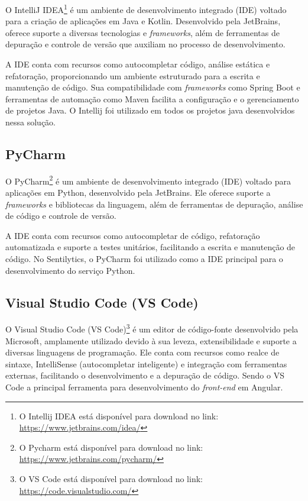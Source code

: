 \documentclass[
	12pt,				%
	oneside,			%
	a4paper,			%
	english,			%
	french,				%
	spanish,			%
	brazil				%
	]{abntex2}
\begin{document}
O IntelliJ IDEA\footnote{O Intellij IDEA está disponível para download
  no link: \url{https://www.jetbrains.com/idea/}} é um ambiente de
desenvolvimento integrado (IDE) voltado para a criação de aplicações em
Java e Kotlin. Desenvolvido pela JetBrains, oferece suporte a diversas
tecnologias e \emph{frameworks}, além de ferramentas de depuração e
controle de versão que auxiliam no processo de desenvolvimento.

A IDE conta com recursos como autocompletar código, análise estática e
refatoração, proporcionando um ambiente estruturado para a escrita e
manutenção de código. Sua compatibilidade com \emph{frameworks} como
Spring Boot e ferramentas de automação como Maven facilita a
configuração e o gerenciamento de projetos Java. O Intellij foi
utilizado em todos os projetos java desenvolvidos nessa solução.

\hypertarget{pycharm}{%
\subsection{PyCharm}\label{pycharm}}

O PyCharm\footnote{O Pycharm está disponível para download no link:
  \url{https://www.jetbrains.com/pycharm/}} é um ambiente de
desenvolvimento integrado (IDE) voltado para aplicações em Python,
desenvolvido pela JetBrains. Ele oferece suporte a \emph{frameworks} e
bibliotecas da linguagem, além de ferramentas de depuração, análise de
código e controle de versão.

A IDE conta com recursos como autocompletar de código, refatoração
automatizada e suporte a testes unitários, facilitando a escrita e
manutenção de código. No Sentilytics, o PyCharm foi utilizado como a IDE
principal para o desenvolvimento do serviço Python.

\hypertarget{visual-studio-code-vs-code}{%
\subsection{Visual Studio Code (VS
Code)}\label{visual-studio-code-vs-code}}

O Visual Studio Code (VS Code)\footnote{O VS Code está disponível para
  download no link: \url{https://code.visualstudio.com/}} é um editor de
código-fonte desenvolvido pela Microsoft, amplamente utilizado devido à
sua leveza, extensibilidade e suporte a diversas linguagens de
programação. Ele conta com recursos como realce de sintaxe, IntelliSense
(autocompletar inteligente) e integração com ferramentas externas,
facilitando o desenvolvimento e a depuração de código. Sendo o VS Code a
principal ferramenta para desenvolvimento do \emph{front-end} em
Angular.
\end{document}
